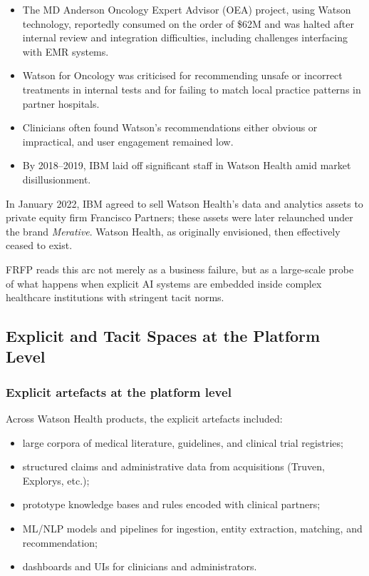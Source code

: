 \begin{itemize}
  \item The MD Anderson Oncology Expert Advisor (OEA) project, using Watson
technology, reportedly consumed on the order of \$62M and was halted
        after internal review and integration difficulties, including challenges
        interfacing with EMR systems.
  \item Watson for Oncology was criticised for recommending unsafe or
        incorrect treatments in internal tests and for failing to match
        local practice patterns in partner hospitals.
  \item Clinicians often found Watson’s recommendations either obvious or
        impractical, and user engagement remained low.
  \item By 2018–2019, IBM laid off significant staff in Watson Health amid
        market disillusionment.
\end{itemize}

In January 2022, IBM agreed to sell Watson Health’s data and analytics assets
to private equity firm Francisco Partners; these assets were later relaunched
under the brand \emph{Merative}. Watson Health, as originally envisioned, then
effectively ceased to exist.

FRFP reads this arc not merely as a business failure, but as a large-scale probe
of what happens when explicit AI systems are embedded inside complex healthcare
institutions with stringent tacit norms.

\subsection{Explicit and Tacit Spaces at the Platform Level}

\subsubsection*{Explicit artefacts at the platform level}

Across Watson Health products, the explicit artefacts included:

\begin{itemize}
  \item large corpora of medical literature, guidelines, and clinical trial
        registries;
  \item structured claims and administrative data from acquisitions
        (Truven, Explorys, etc.);
  \item prototype knowledge bases and rules encoded with clinical partners;
  \item ML/NLP models and pipelines for ingestion, entity extraction,
        matching, and recommendation;
  \item dashboards and UIs for clinicians and administrators.
\end{itemize}

